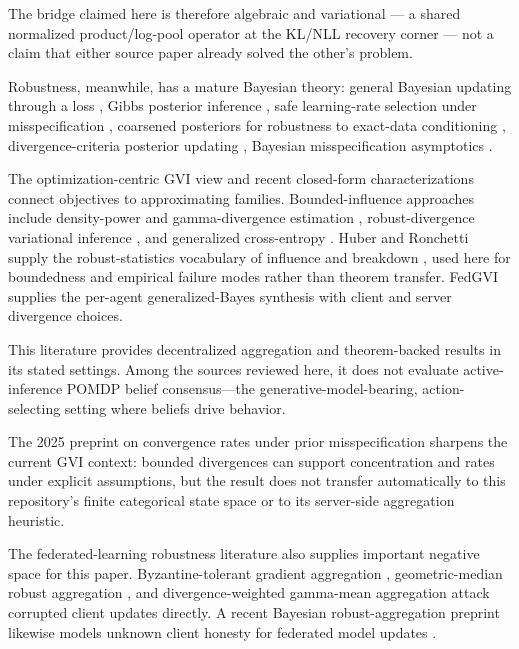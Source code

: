 \documentclass[
  english,
]{article}
\theoremstyle{plain}
\theoremstyle{definition}
\theoremstyle{remark}
\theoremstyle{definition}
\begin{document}
The bridge claimed here is therefore algebraic and variational --- a
shared normalized product/log-pool operator at the KL/NLL recovery
corner --- not a claim that either source paper already solved the
other's problem.

Robustness, meanwhile, has a mature Bayesian theory: general Bayesian
updating through a loss \citep{bissiri2016general}, Gibbs posterior
inference \citep{jiang2008gibbs}, safe learning-rate selection under
misspecification \citep{grunwald2012safe}, coarsened posteriors for
robustness to exact-data conditioning \citep{miller2018coarsening},
divergence-criteria posterior updating \citep{jewson2018divergence},
Bayesian misspecification asymptotics
\citep{kleijn2012misspecification}.

The optimization-centric GVI view \citep{knoblauch2022generalized} and
recent closed-form characterizations \citep{nguyen2026closedformgvi}
connect objectives to approximating families. Bounded-influence
approaches include density-power and gamma-divergence estimation
\citep{basu1998robust, fujisawa2008robust, ghosh2015robust},
robust-divergence variational inference \citep{futami2018robustvi}, and
generalized cross-entropy \citep{zhang2018generalized}. Huber and
Ronchetti supply the robust-statistics vocabulary of influence and
breakdown \citep{huber2009robust}, used here for boundedness and
empirical failure modes rather than theorem transfer. FedGVI
\citep{mildner2025fedgvi} supplies the per-agent generalized-Bayes
synthesis with client and server divergence choices.

This literature provides decentralized aggregation and theorem-backed
results in its stated settings. Among the sources reviewed here, it does
not evaluate active-inference POMDP belief consensus---the
generative-model-bearing, action-selecting setting where beliefs drive
behavior.

The 2025 preprint on convergence rates under prior misspecification
\citep{mildner2025rates} sharpens the current GVI context: bounded
divergences can support concentration and rates under explicit
assumptions, but the result does not transfer automatically to this
repository's finite categorical state space or to its server-side
aggregation heuristic.

The federated-learning robustness literature also supplies important
negative space for this paper. Byzantine-tolerant gradient aggregation
\citep{blanchard2017krum}, geometric-median robust aggregation
\citep{pillutla2022robust}, and divergence-weighted gamma-mean
aggregation \citep{li2022gammafl} attack corrupted client updates
directly. A recent Bayesian robust-aggregation preprint likewise models
unknown client honesty for federated model updates
\citep{karakulev2025bayesian}.
\end{document}
